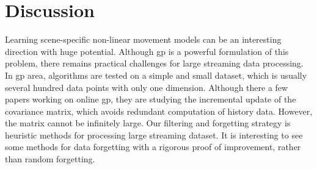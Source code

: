 \section{Discussion}

Learning scene-specific non-linear movement models can be an interesting direction with huge potential. 
Although \gls{gp} is a powerful formulation of this problem, there remains practical challenges for large streaming data processing.
In \gls{gp} area, algorithms are tested on a simple and small dataset, which is usually several hundred data points with only one dimension.
Although there a few papers working on online \gls{gp}, they are studying the incremental update of the covariance matrix, which avoids redundant computation of history data.
However, the matrix cannot be infinitely large.
Our filtering and forgetting strategy is heuristic methods for processing large streaming dataset.
It is interesting to see some methods for data forgetting with a rigorous proof of improvement, rather than random forgetting. 